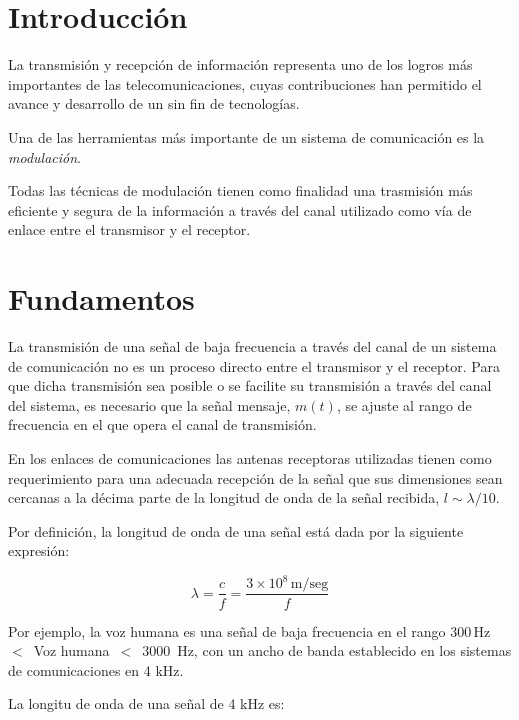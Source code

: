 
\section{Introducción}
\label{sec:A92.introducción}

La transmisión y recepción de información representa uno de los logros más importantes de las telecomunicaciones, cuyas contribuciones han permitido el avance y desarrollo de un sin fin de tecnologías.

Una de las herramientas más importante de un sistema de comunicación es la \emph{modulación}.

Todas las técnicas de modulación tienen como finalidad una trasmisión más eficiente y segura de la información a través del canal utilizado como vía de enlace entre el transmisor y el receptor.

\section{Fundamentos}
\label{sec:A02.fundamentos.modulacion}

La transmisión de una señal de baja frecuencia a través del canal de un sistema de comunicación no es un proceso directo entre el transmisor y el receptor.
Para que dicha transmisión sea posible o se facilite su transmisión a través del canal del sistema, es necesario que la señal mensaje, $m(t)$,
se ajuste al rango de frecuencia en el que opera el canal de transmisión.

En los enlaces de comunicaciones las antenas receptoras utilizadas tienen como requerimiento para una adecuada recepción de la señal que sus dimensiones sean cercanas
a la décima parte de la longitud de onda de la señal recibida, $ l \sim \lambda/10$.

Por definición, la longitud de onda de una señal está dada por la siguiente expresión:

\begin{equation}
  \label{eq:A02.longitud.onda.senial} \displaystyle
  \lambda = \frac{c}{f} = \frac{3\times 10^8 \,\text{m/seg}}{f}
\end{equation}

Por ejemplo, la voz humana es una señal de baja frecuencia en el rango 300\,Hz $<$\, Voz humana \,$<$\, 3000 \,Hz, con un ancho de banda establecido en los sistemas de comunicaciones en 4 kHz.

La longitu de onda de una señal de 4 kHz es:

